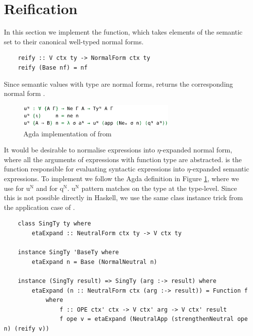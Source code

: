 
\section{Reification}

In this section we implement the  function, which takes elements of the semantic set to their canonical well-typed normal forms. 

\begin{lstlisting}
    reify :: V ctx ty -> NormalForm ctx ty
    reify (Base nf) = nf
\end{lstlisting}

Since semantic values with type  are normal forms,  returns the corresponding normal form .

\begin{figure}[h]
    \centering
    \includegraphics[width=0.7\textwidth]{./images/agda_eta_expand.png}
    \caption{Agda implementation of  from \cite{AgdaNbe}}
    \label{fig:agdaEtaExpand}
\end{figure}

It would be desirable to normalise expressions into $\eta$-expanded normal form, where all the arguments of expressions with function type are abstracted.  is the function responsible for evaluating syntactic expressions into $\eta$-expanded semantic expressions. To implement  we follow the Agda definition in Figure \ref{fig:agdaEtaExpand}, where we use  for $\text{u}^\text{N}$ and  for $\text{q}^\text{N}$. $\text{u}^\text{N}$ pattern matches on the type  at the type-level. Since this is not possible directly in Haskell, we use the same class instance trick from the application case of . 

\begin{lstlisting}
    class SingTy ty where
        etaExpand :: NeutralForm ctx ty -> V ctx ty

    instance SingTy 'BaseTy where
        etaExpand n = Base (NormalNeutral n)

    instance (SingTy result) => SingTy (arg :-> result) where
        etaExpand (n :: NeutralForm ctx (arg :-> result)) = Function f 
            where
                f :: OPE ctx' ctx -> V ctx' arg -> V ctx' result
                f ope v = etaExpand (NeutralApp (strengthenNeutral ope n) (reify v))  
\end{lstlisting}

